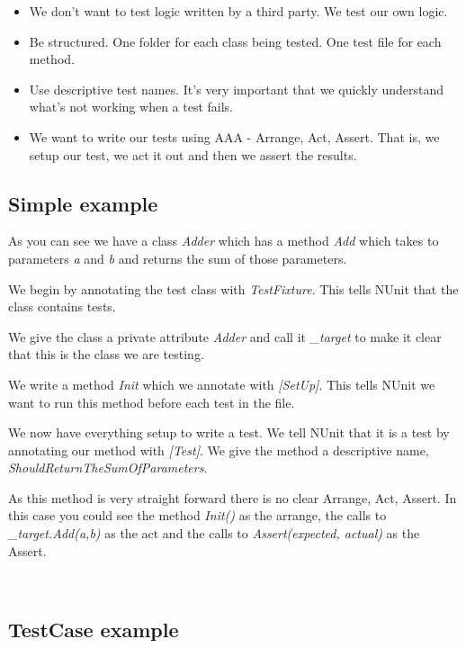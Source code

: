 \documentclass[12pt]{article}
\begin{document}
\begin{itemize}
	\item We don't want to test logic written by a third party. We test our own logic.
	\item Be structured. One folder for each class being tested. One test file for each method.
	\item Use descriptive test names. It's very important that we quickly understand what's not working when a test fails.
	\item We want to write our tests using AAA - Arrange, Act, Assert. That is, we setup our test, we act it out and then we assert the results.
\end{itemize}

\subsection{Simple example}


As you can see we have a class \emph{Adder} which has a method \emph{Add} which takes to parameters \emph{a} and \emph{b} and returns the sum of those parameters.

We begin by annotating the test class with \emph{TestFixture}. This tells NUnit that the class contains tests.

We give the class a private attribute \emph{Adder} and call it \emph{\_target} to make it clear that this is the class we are testing.

We write a method \emph{Init} which we annotate with \emph{[SetUp]}. This tells NUnit we want to run this method before each test in the file.

We now have everything setup to write a test. We tell NUnit that it is a test by annotating our method with \emph{[Test]}. We give the method a descriptive name, \emph{ShouldReturnTheSumOfParameters}.

As this method is very straight forward there is no clear Arrange, Act, Assert. In this case you could see the method \emph{Init()} as the arrange, the calls to \emph{\_target.Add(a,b)} as the act and the calls to \emph{Assert(expected, actual)} as the Assert.

~\\
\subsection{TestCase example}

\end{document}

